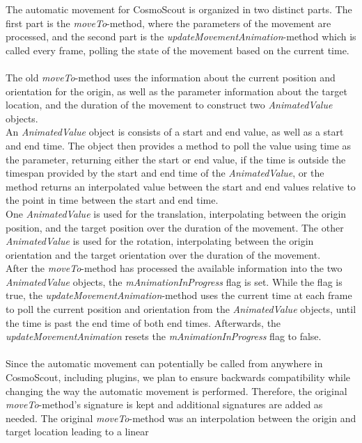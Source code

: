 The automatic movement for CosmoScout is organized in two distinct parts.
The first part is the \textit{moveTo}-method, where the parameters of the movement are processed, and the second
part is the \textit{updateMovementAnimation}-method which is called every frame, polling the state of the
movement based on the current time.
\\
\\
The old \textit{moveTo}-method uses the information about the current position and orientation for the origin, as
well as the parameter information about the target location, and the duration of the movement to construct two
\textit{AnimatedValue} objects.
\\
An \textit{AnimatedValue} object is consists of a start and end value, as well as a start and end time.
The object then provides a method to poll the value using time as the parameter, returning either the start or
end value, if the time is outside the timespan provided by the start and end time of the \textit{AnimatedValue}, or
the method returns an interpolated value between the start and end values relative to the point in time between the
start and end time.
\\
One \textit{AnimatedValue} is used for the translation, interpolating between the origin
position, and the target position over the duration of the movement.
The other \textit{AnimatedValue} is used for the rotation, interpolating between the origin orientation and the
target orientation over the duration of the movement.
\\
After the \textit{moveTo}-method has processed the available information into the two \textit{AnimatedValue} objects,
the \textit{mAnimationInProgress} flag is set.
While the flag is true, the \textit{updateMovementAnimation}-method uses the current time at each frame to poll the
current position and orientation from the \textit{AnimatedValue} objects, until the time is past the end time of both
end times.
Afterwards, the \textit{updateMovementAnimation} resets the \textit{mAnimationInProgress} flag to false.
\\
\\
Since the automatic movement can potentially be called from anywhere in CosmoScout, including plugins, we plan to
ensure backwards compatibility while changing the way the automatic movement is performed.
Therefore, the original \textit{moveTo}-method's signature is kept and additional signatures are added as needed.
The original \textit{moveTo}-method was an interpolation between the origin and target location leading to a linear
